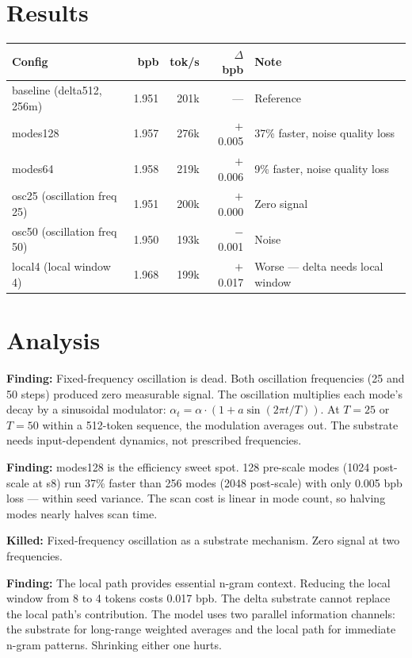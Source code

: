 \documentclass[11pt,a4paper]{report}
\newcommand{\finding}[1]{\textcolor{finding}{\textbf{Finding:}} #1}
\newcommand{\killed}[1]{\textcolor{killed}{\textbf{Killed:}} #1}
\begin{document}
\section{Results}

\begin{center}
\begin{tabular}{lrrrl}
\toprule
Config & bpb & tok/s & $\Delta$ bpb & Note \\
\midrule
baseline (delta512, 256m) & 1.951 & 201k & --- & Reference \\
modes128 & 1.957 & 276k & $+$0.005 & 37\% faster, noise quality loss \\
modes64 & 1.958 & 219k & $+$0.006 & 9\% faster, noise quality loss \\
osc25 (oscillation freq 25) & 1.951 & 200k & $+$0.000 & Zero signal \\
osc50 (oscillation freq 50) & 1.950 & 193k & $-$0.001 & Noise \\
local4 (local window 4) & 1.968 & 199k & $+$0.017 & Worse --- delta needs local window \\
\bottomrule
\end{tabular}
\end{center}

\section{Analysis}

\finding{Fixed-frequency oscillation is dead.} Both oscillation frequencies (25 and 50 steps) produced zero measurable signal. The oscillation multiplies each mode's decay by a sinusoidal modulator: $\alpha_t = \alpha \cdot (1 + a \sin(2\pi t / T))$. At $T = 25$ or $T = 50$ within a 512-token sequence, the modulation averages out. The substrate needs input-dependent dynamics, not prescribed frequencies.

\finding{modes128 is the efficiency sweet spot.} 128 pre-scale modes (1024 post-scale at s8) run 37\% faster than 256 modes (2048 post-scale) with only 0.005 bpb loss --- within seed variance. The scan cost is linear in mode count, so halving modes nearly halves scan time.

\killed{Fixed-frequency oscillation as a substrate mechanism. Zero signal at two frequencies.}

\finding{The local path provides essential n-gram context.} Reducing the local window from 8 to 4 tokens costs 0.017 bpb. The delta substrate cannot replace the local path's contribution. The model uses two parallel information channels: the substrate for long-range weighted averages and the local path for immediate n-gram patterns. Shrinking either one hurts.
\end{document}
